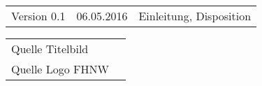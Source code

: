 \begin{tiny}
    \begin{tabular}{>{\ttfamily}lrl}
        Version 0.1 & 06.05.2016 & Einleitung, Disposition \\
    \end{tabular}

    \vspace{1em}
    \begin{tabular}{l @{${}:{}$} l}
        Quelle Titelbild & \cite{ref:titlepage:pvanlage} \\
        Quelle Logo FHNW & \cite{ref:fhnwlogo}           \\
    \end{tabular}
\end{tiny}
